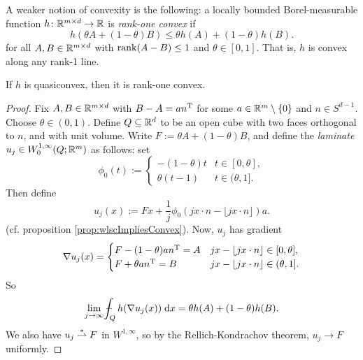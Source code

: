 A weaker notion of convexity is the following: a locally bounded Borel-measurable function $h \colon \mathbb{R}^{m \times d} \to \mathbb{R}$ is \textit{rank-one convex} if 
\begin{equation}
    h(\theta A + (1-\theta)B) \leq \theta h(A) + (1-\theta) h(B).
\end{equation}
for all $A,B \in \mathbb{R}^{m \times d}$ with $\operatorname{\mathrm{rank}}(A-B) \leq 1$ and $\theta \in [0,1]$.
That is, $h$ is convex along any rank-1 line.
\begin{theorem}
    If $h$ is quasiconvex, then it is rank-one convex.
\end{theorem}
\begin{proof}
    Fix $A,B \in \mathbb{R}^{m \times d}$ with $B - A = an^{\mathrm{T}}$ for some $a \in \mathbb{R}^m \setminus \left\{ {0} \right\}$ and $n \in S^{d-1}$. Choose $\theta \in (0,1)$. Define $Q \subseteq \mathbb{R}^d$ to be an open cube with two faces orthogonal to $n$, and with unit volume. Write $F := \theta A + (1-\theta)B$, and define the \textit{laminate} $u_j \in W_0^{1,\infty}(Q;\mathbb{R}^m)$ as follows: set
    \begin{equation}
        \phi_0(t) :=
        \begin{cases}
            -(1-\theta)t & t \in [0,\theta], \\
            \theta(t-1)  & t \in (\theta,1].
        \end{cases}
    \end{equation}
    Then define 
    \begin{equation}
        u_j(x) := Fx + \frac{1}{j} \phi_0(jx \cdot n - \lfloor jx \cdot n \rfloor)a.
    \end{equation}
    (cf. proposition \ref{prop:wlscImpliesConvex}). Now, $u_j$ has gradient 
    \begin{equation}
        \nabla u_j(x) = 
        \begin{cases}
            F - (1-\theta) an^{\mathrm{T}} = A & jx - \lfloor jx \cdot n \rfloor \in [0,\theta], \\
            F + \theta an^{\mathrm{T}} = B     & jx - \lfloor jx \cdot n \rfloor \in (\theta,1].
        \end{cases}
    \end{equation}
    So 
    \begin{equation} \label{eq:averageOfLaminate}
        \lim_{j \to \infty} \dashint_{Q} h(\nabla u_j(x)) \; \d x = \theta h(A) + (1-\theta) h(B).
    \end{equation}
    We also have $u_j \overset{\ast}{\rightharpoonup} F$ in $W^{1,\infty}$, so by the Rellich-Kondrachov theorem, $u_j \to F$ uniformly.


\end{proof}
